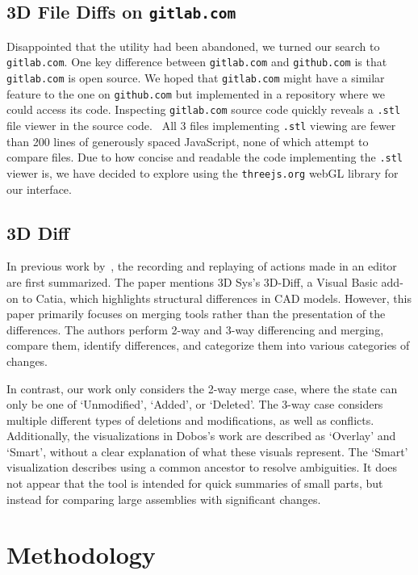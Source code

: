 \documentclass[sigconf,authorversion,nonacm]{acmart}
\begin{document}
\subsection{3D File Diffs on \texttt{gitlab.com}}

Disappointed that the utility had been abandoned, we turned our search to \texttt{gitlab.com}.
One key difference between \texttt{gitlab.com} and \texttt{github.com} is that \texttt{gitlab.com} is open source.
We hoped that \texttt{gitlab.com} might have a similar feature to the one on \texttt{github.com} but implemented in a repository where we could access its code.
Inspecting \texttt{gitlab.com} source code quickly reveals a \texttt{.stl} file viewer in the source code.~\cite{gitlabsource}
All 3 files implementing \texttt{.stl} viewing are fewer than 200 lines of generously spaced JavaScript, none of which attempt to compare files.
Due to how concise and readable the code implementing the \texttt{.stl} viewer is, we have decided to explore using the \texttt{threejs.org} webGL library for our interface.

\subsection{3D Diff}

In previous work by~\citet{Dobos}, the recording and replaying of actions made in an editor are first summarized. 
The paper mentions 3D Sys's 3D-Diff, a Visual Basic add-on to Catia, which highlights structural differences in CAD models. 
However, this paper primarily focuses on merging tools rather than the presentation of the differences. 
The authors perform 2-way and 3-way differencing and merging, compare them, identify differences, and categorize them into various categories of changes.

In contrast, our work only considers the 2-way merge case, where the state can only be one of `Unmodified', `Added', or `Deleted'. 
The 3-way case considers multiple different types of deletions and modifications, as well as conflicts. 
Additionally, the visualizations in Dobos's work are described as `Overlay' and `Smart', without a clear explanation of what these visuals represent. 
The `Smart' visualization describes using a common ancestor to resolve ambiguities. It does not appear that the tool is intended for quick summaries of small parts, but instead for comparing large assemblies with significant changes.

\section{Methodology}
\end{document}
